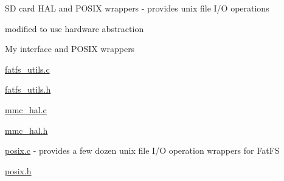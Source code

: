 SD card H\+AL and P\+O\+S\+IX wrappers -\/ provides unix file I/O operations
\begin{DoxyItemize}
\item modified to use hardware abstraction
\end{DoxyItemize}

My interface and P\+O\+S\+IX wrappers
\begin{DoxyItemize}
\item \hyperlink{fatfs__utils_8c}{fatfs\+\_\+utils.\+c}
\item \hyperlink{fatfs__utils_8h}{fatfs\+\_\+utils.\+h}
\item \hyperlink{mmc__hal_8c}{mmc\+\_\+hal.\+c}
\item \hyperlink{mmc__hal_8h}{mmc\+\_\+hal.\+h}
\item \hyperlink{posix_8c}{posix.\+c} -\/ provides a few dozen unix file I/O operation wrappers for Fat\+FS
\item \hyperlink{posix_8h}{posix.\+h}
\end{DoxyItemize}

